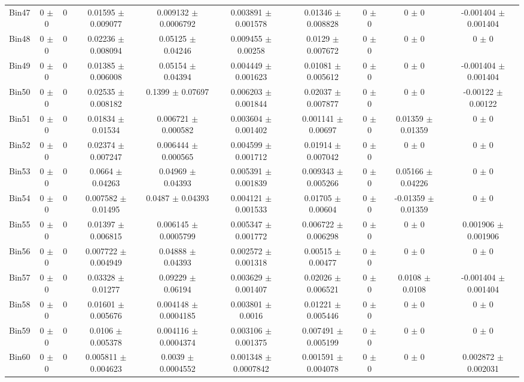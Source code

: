 \begin{tabular}{@{\extracolsep{4pt}}lccccccccc@{}}
     Bin47 & 0 $\pm$ 0 & 0 & 0.01595 $\pm$ 0.009077 & 0.009132 $\pm$ 0.0006792 & 0.003891 $\pm$ 0.001578 & 0.01346 $\pm$ 0.008828 & 0 $\pm$ 0 & 0 $\pm$ 0 & -0.001404 $\pm$ 0.001404 \\ 
     Bin48 & 0 $\pm$ 0 & 0 & 0.02236 $\pm$ 0.008094 & 0.05125 $\pm$ 0.04246 & 0.009455 $\pm$ 0.00258 & 0.0129 $\pm$ 0.007672 & 0 $\pm$ 0 & 0 $\pm$ 0 & 0 $\pm$ 0 \\ 
     Bin49 & 0 $\pm$ 0 & 0 & 0.01385 $\pm$ 0.006008 & 0.05154 $\pm$ 0.04394 & 0.004449 $\pm$ 0.001623 & 0.01081 $\pm$ 0.005612 & 0 $\pm$ 0 & 0 $\pm$ 0 & -0.001404 $\pm$ 0.001404 \\ 
     Bin50 & 0 $\pm$ 0 & 0 & 0.02535 $\pm$ 0.008182 & 0.1399 $\pm$ 0.07697 & 0.006203 $\pm$ 0.001844 & 0.02037 $\pm$ 0.007877 & 0 $\pm$ 0 & 0 $\pm$ 0 & -0.00122 $\pm$ 0.00122 \\ 
     Bin51 & 0 $\pm$ 0 & 0 & 0.01834 $\pm$ 0.01534 & 0.006721 $\pm$ 0.000582 & 0.003604 $\pm$ 0.001402 & 0.001141 $\pm$ 0.00697 & 0 $\pm$ 0 & 0.01359 $\pm$ 0.01359 & 0 $\pm$ 0 \\ 
     Bin52 & 0 $\pm$ 0 & 0 & 0.02374 $\pm$ 0.007247 & 0.006444 $\pm$ 0.000565 & 0.004599 $\pm$ 0.001712 & 0.01914 $\pm$ 0.007042 & 0 $\pm$ 0 & 0 $\pm$ 0 & 0 $\pm$ 0 \\ 
     Bin53 & 0 $\pm$ 0 & 0 & 0.0664 $\pm$ 0.04263 & 0.04969 $\pm$ 0.04393 & 0.005391 $\pm$ 0.001839 & 0.009343 $\pm$ 0.005266 & 0 $\pm$ 0 & 0.05166 $\pm$ 0.04226 & 0 $\pm$ 0 \\ 
     Bin54 & 0 $\pm$ 0 & 0 & 0.007582 $\pm$ 0.01495 & 0.0487 $\pm$ 0.04393 & 0.004121 $\pm$ 0.001533 & 0.01705 $\pm$ 0.00604 & 0 $\pm$ 0 & -0.01359 $\pm$ 0.01359 & 0 $\pm$ 0 \\ 
     Bin55 & 0 $\pm$ 0 & 0 & 0.01397 $\pm$ 0.006815 & 0.006145 $\pm$ 0.0005799 & 0.005347 $\pm$ 0.001772 & 0.006722 $\pm$ 0.006298 & 0 $\pm$ 0 & 0 $\pm$ 0 & 0.001906 $\pm$ 0.001906 \\ 
     Bin56 & 0 $\pm$ 0 & 0 & 0.007722 $\pm$ 0.004949 & 0.04888 $\pm$ 0.04393 & 0.002572 $\pm$ 0.001318 & 0.00515 $\pm$ 0.00477 & 0 $\pm$ 0 & 0 $\pm$ 0 & 0 $\pm$ 0 \\ 
     Bin57 & 0 $\pm$ 0 & 0 & 0.03328 $\pm$ 0.01277 & 0.09229 $\pm$ 0.06194 & 0.003629 $\pm$ 0.001407 & 0.02026 $\pm$ 0.006521 & 0 $\pm$ 0 & 0.0108 $\pm$ 0.0108 & -0.001404 $\pm$ 0.001404 \\ 
     Bin58 & 0 $\pm$ 0 & 0 & 0.01601 $\pm$ 0.005676 & 0.004148 $\pm$ 0.0004185 & 0.003801 $\pm$ 0.0016 & 0.01221 $\pm$ 0.005446 & 0 $\pm$ 0 & 0 $\pm$ 0 & 0 $\pm$ 0 \\ 
     Bin59 & 0 $\pm$ 0 & 0 & 0.0106 $\pm$ 0.005378 & 0.004116 $\pm$ 0.0004374 & 0.003106 $\pm$ 0.001375 & 0.007491 $\pm$ 0.005199 & 0 $\pm$ 0 & 0 $\pm$ 0 & 0 $\pm$ 0 \\ 
     Bin60 & 0 $\pm$ 0 & 0 & 0.005811 $\pm$ 0.004623 & 0.0039 $\pm$ 0.0004552 & 0.001348 $\pm$ 0.0007842 & 0.001591 $\pm$ 0.004078 & 0 $\pm$ 0 & 0 $\pm$ 0 & 0.002872 $\pm$ 0.002031 \\ 
\hline\hline
  \end{tabular}
